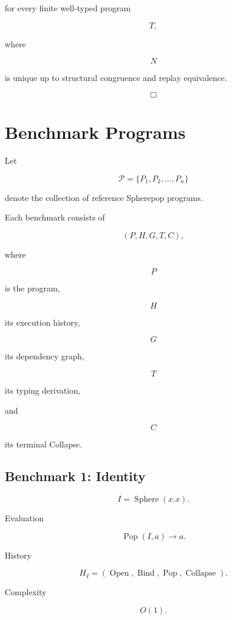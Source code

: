 \documentclass[12pt,oneside]{article}
\theoremstyle{definition}
\theoremstyle{remark}
\begin{document}
for every finite well-typed program

\[
T,
\]

where

\[
N
\]

is unique up to structural congruence and replay equivalence.

\[
\Box
\]

\section{Benchmark Programs}

Let

\[
\mathcal P
=
\{
P_1,
P_2,
\ldots,
P_n
\}
\]

denote the collection of reference Spherepop programs.

Each benchmark consists of

\[
(P,H,G,T,C),
\]

where

\[
P
\]

is the program,

\[
H
\]

its execution history,

\[
G
\]

its dependency graph,

\[
T
\]

its typing derivation,

and

\[
C
\]

its terminal Collapse.

\subsection*{Benchmark 1: Identity}

\[
I
=
\operatorname{Sphere}(x.x).
\]

Evaluation

\[
\operatorname{Pop}(I,a)
\rightarrow
a.
\]

History

\[
H_I
=
(
\operatorname{Open},
\operatorname{Bind},
\operatorname{Pop},
\operatorname{Collapse}
).
\]

Complexity

\[
O(1).
\]
\end{document}
